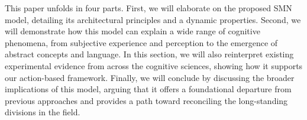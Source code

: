 This paper unfolds in four parts. First, we will elaborate on the proposed SMN model, detailing its architectural principles and a dynamic properties. Second, we will demonstrate how this model can explain a wide range of cognitive phenomena, from subjective experience and perception to the emergence of abstract concepts and language. In this section, we will also reinterpret existing experimental evidence from across the cognitive sciences, showing how it supports our action-based framework. Finally, we will conclude by discussing the broader implications of this model, arguing that it offers a foundational departure from previous approaches and provides a path toward reconciling the long-standing divisions in the field.